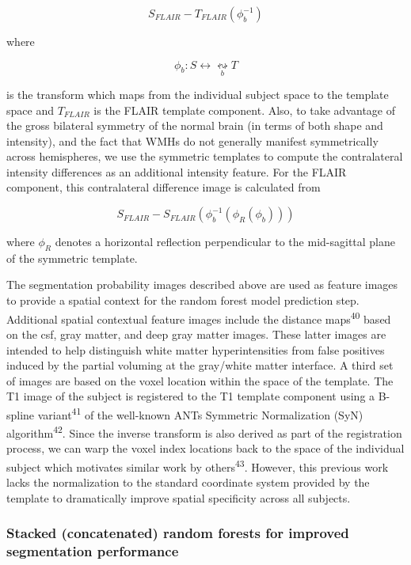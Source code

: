 \documentclass[11pt,]{article}
\begin{document}
\[S_{FLAIR} - T_{FLAIR}\left(\phi_b^{-1}\right)\]

where

\[\phi_b: S  \leftrightarrow \underset{b}{\leftrightsquigarrow} T\]

is the transform which maps from the individual subject space to the
template space and \(T_{FLAIR}\) is the FLAIR template component. Also,
to take advantage of the gross bilateral symmetry of the normal brain
(in terms of both shape and intensity), and the fact that WMHs do not
generally manifest symmetrically across hemispheres, we use the
symmetric templates to compute the contralateral intensity differences
as an additional intensity feature. For the FLAIR component, this
contralateral difference image is calculated from

\[S_{FLAIR} - S_{FLAIR}\left(\phi_b^{-1}\left(\phi_R\left(\phi_b\right)\right)\right)\]

where \(\phi_R\) denotes a horizontal reflection perpendicular to the
mid-sagittal plane of the symmetric template.

The segmentation probability images described above are used as feature
images to provide a spatial context for the random forest model
prediction step. Additional spatial contextual feature images include
the distance maps\textsuperscript{40} based on the csf, gray matter, and
deep gray matter images. These latter images are intended to help
distinguish white matter hyperintensities from false positives induced
by the partial voluming at the gray/white matter interface. A third set
of images are based on the voxel location within the space of the
template. The T1 image of the subject is registered to the T1 template
component using a B-spline variant\textsuperscript{41} of the well-known
ANTs Symmetric Normalization (SyN) algorithm\textsuperscript{42}. Since
the inverse transform is also derived as part of the registration
process, we can warp the voxel index locations back to the space of the
individual subject which motivates similar work by
others\textsuperscript{43}. However, this previous work lacks the
normalization to the standard coordinate system provided by the template
to dramatically improve spatial specificity across all subjects.

\subsubsection{Stacked (concatenated) random forests for improved
segmentation
performance}\label{stacked-concatenated-random-forests-for-improved-segmentation-performance}
\end{document}
